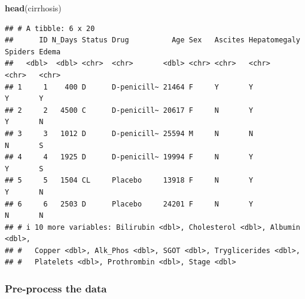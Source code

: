 \documentclass[
]{article}
\newenvironment{Shaded}{\begin{snugshade}}{\end{snugshade}}
\newcommand{\FunctionTok}[1]{\textcolor[rgb]{0.13,0.29,0.53}{\textbf{#1}}}
\newcommand{\NormalTok}[1]{#1}
\begin{document}
\begin{Shaded}
\begin{Highlighting}[]
\FunctionTok{head}\NormalTok{(cirrhosis)}
\end{Highlighting}
\end{Shaded}

\begin{verbatim}
## # A tibble: 6 x 20
##      ID N_Days Status Drug          Age Sex   Ascites Hepatomegaly Spiders Edema
##   <dbl>  <dbl> <chr>  <chr>       <dbl> <chr> <chr>   <chr>        <chr>   <chr>
## 1     1    400 D      D-penicill~ 21464 F     Y       Y            Y       Y    
## 2     2   4500 C      D-penicill~ 20617 F     N       Y            Y       N    
## 3     3   1012 D      D-penicill~ 25594 M     N       N            N       S    
## 4     4   1925 D      D-penicill~ 19994 F     N       Y            Y       S    
## 5     5   1504 CL     Placebo     13918 F     N       Y            Y       N    
## 6     6   2503 D      Placebo     24201 F     N       Y            N       N    
## # i 10 more variables: Bilirubin <dbl>, Cholesterol <dbl>, Albumin <dbl>,
## #   Copper <dbl>, Alk_Phos <dbl>, SGOT <dbl>, Tryglicerides <dbl>,
## #   Platelets <dbl>, Prothrombin <dbl>, Stage <dbl>
\end{verbatim}

\hypertarget{pre-process-the-data}{%
\subsubsection{Pre-process the data}\label{pre-process-the-data}}
\end{document}

